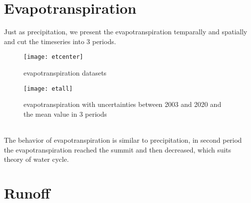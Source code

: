 \section{Evapotranspiration}
Just as precipitation, we present the evapotranspiration temparally and spatially and cut the timeseries into 3 periods. 
\begin{figure}[htbp]
	\centering
	\texttt{[image: etcenter]} %
	\caption{evapotranspiration datasets} 
	\label{fig:etcenter}
\end{figure}
\begin{figure}[htbp]
	\centering
	\texttt{[image: etall]} %
	\caption{evapotranspiration with uncertainties between 2003 and 2020 and the mean value in 3 periods} 
	\label{fig:etall}
\end{figure}
\\
The behavior of evapotranspiration is similar to precipitation, in second period the evapotranspiration reached the summit and then decreased, which suits theory of water cycle.  
\clearpage
\section{Runoff}
